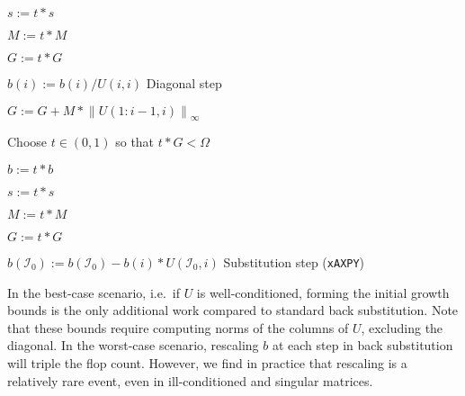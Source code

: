 \documentclass{article}
\begin{document}
\begin{algorithm}[H]
\begin{algorithmic}
    \State \(s := t * s\)

    \State \(M := t * M\)

    \State \(G := t * G\)

    \EndIf

    \State \(b(i) := b(i) / U(i,i)\) \Comment Diagonal step

    \State \(G := G + M * \left\lVert U(1:i-1,i) \right\rVert_\infty\)


    \State Choose \(t\in\left(0,1\right)\) so that \(t *G < \Omega\)

    \State \(b := t *b\)

    \State \(s := t *s\)

    \State \(M := t*M\)

    \State \(G := t *G\)
    
    \EndIf

    \State \(b(\mathcal{I}_0) := b(\mathcal{I}_0) - b(i) * U(\mathcal{I}_0,i)\) \Comment Substitution step (\texttt{xAXPY})

    \EndFor

    \EndIf

    \EndProcedure

  \end{algorithmic}
\end{algorithm}
\noindent
In the best-case scenario, i.e.\ if \(U\) is well-conditioned, forming
the initial growth bounds is the only additional work compared to
standard back substitution. Note that these bounds require computing
norms of the columns of \(U\), excluding the diagonal. In the
worst-case scenario, rescaling \(b\) at each step in back substitution
will triple the flop count. However, we find in practice that
rescaling is a relatively rare event, even in ill-conditioned and
singular matrices.
\end{document}
